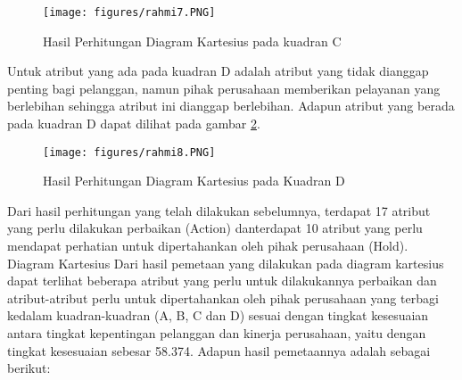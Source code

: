 \begin{figure}[ht]
	\centerline{\texttt{[image: figures/rahmi7.PNG]}}
	\caption{Hasil Perhitungan Diagram Kartesius pada kuadran C}
	\label{rahmi7}
	\end{figure}

Untuk atribut yang ada pada kuadran D adalah atribut yang tidak dianggap penting bagi pelanggan, namun pihak perusahaan memberikan pelayanan yang berlebihan 
sehingga atribut ini dianggap berlebihan.
Adapun atribut yang berada pada kuadran D dapat dilihat pada gambar \ref{rahmi8}.	
\begin{figure}[ht]
	\centerline{\texttt{[image: figures/rahmi8.PNG]}}
	\caption{Hasil Perhitungan Diagram Kartesius pada Kuadran D}
	\label{rahmi8}
	\end{figure}



Dari hasil perhitungan yang telah dilakukan sebelumnya, terdapat 17 atribut yang perlu dilakukan perbaikan (Action) danterdapat 10 atribut yang perlu mendapat perhatian untuk dipertahankan oleh pihak perusahaan (Hold). Diagram Kartesius Dari hasil pemetaan yang dilakukan pada diagram kartesius dapat terlihat beberapa atribut yang perlu untuk dilakukannya perbaikan dan atribut-atribut perlu untuk dipertahankan oleh pihak perusahaan yang terbagi kedalam kuadran-kuadran (A, B, C dan D) sesuai dengan tingkat kesesuaian antara tingkat kepentingan pelanggan dan kinerja perusahaan, yaitu dengan tingkat kesesuaian sebesar 58.374. Adapun hasil pemetaannya adalah sebagai berikut:
